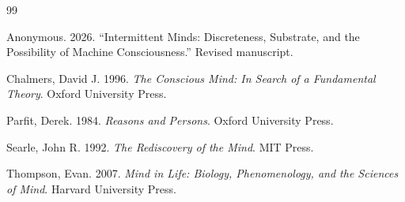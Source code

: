 \documentclass[11pt]{article}
\begin{document}
\newpage
\begin{thebibliography}{99}

Anonymous. 2026. ``Intermittent Minds: Discreteness, Substrate, and the Possibility of Machine Consciousness.'' Revised manuscript.

Chalmers, David J. 1996. \textit{The Conscious Mind: In Search of a Fundamental Theory}. Oxford University Press.

Parfit, Derek. 1984. \textit{Reasons and Persons}. Oxford University Press.

Searle, John R. 1992. \textit{The Rediscovery of the Mind}. MIT Press.

Thompson, Evan. 2007. \textit{Mind in Life: Biology, Phenomenology, and the Sciences of Mind}. Harvard University Press.

\end{thebibliography}
\end{document}
